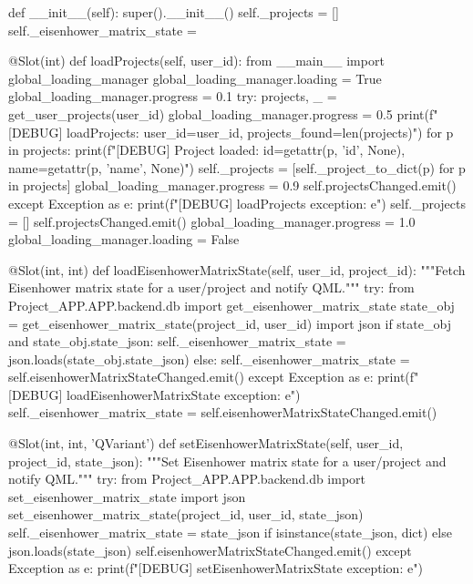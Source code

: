 \documentclass{report}
\begin{document}
\begin{python}
    def __init__(self):
        super().__init__()
        self._projects = []
        self._eisenhower_matrix_state = {}

    @Slot(int)
    def loadProjects(self, user_id):
        from __main__ import global_loading_manager
        global_loading_manager.loading = True
        global_loading_manager.progress = 0.1
        try:
            projects, _ = get_user_projects(user_id)
            global_loading_manager.progress = 0.5
            print(f"[DEBUG] loadProjects: user_id={user_id}, projects_found={len(projects)}")
            for p in projects:
                print(f"[DEBUG] Project loaded: id={getattr(p, 'id', None)}, name={getattr(p, 'name', None)}")
            self._projects = [self._project_to_dict(p) for p in projects]
            global_loading_manager.progress = 0.9
            self.projectsChanged.emit()
        except Exception as e:
            print(f"[DEBUG] loadProjects exception: {e}")
            self._projects = []
            self.projectsChanged.emit()
        global_loading_manager.progress = 1.0
        global_loading_manager.loading = False

    @Slot(int, int)
    def loadEisenhowerMatrixState(self, user_id, project_id):
        """Fetch Eisenhower matrix state for a user/project and notify QML."""
        try:
            from Project_APP.APP.backend.db import get_eisenhower_matrix_state
            state_obj = get_eisenhower_matrix_state(project_id, user_id)
            import json
            if state_obj and state_obj.state_json:
                self._eisenhower_matrix_state = json.loads(state_obj.state_json)
            else:
                self._eisenhower_matrix_state = {}
            self.eisenhowerMatrixStateChanged.emit()
        except Exception as e:
            print(f"[DEBUG] loadEisenhowerMatrixState exception: {e}")
            self._eisenhower_matrix_state = {}
            self.eisenhowerMatrixStateChanged.emit()

    @Slot(int, int, 'QVariant')
    def setEisenhowerMatrixState(self, user_id, project_id, state_json):
        """Set Eisenhower matrix state for a user/project and notify QML."""
        try:
            from Project_APP.APP.backend.db import set_eisenhower_matrix_state
            import json
            set_eisenhower_matrix_state(project_id, user_id, state_json)
            self._eisenhower_matrix_state = state_json if isinstance(state_json, dict) else json.loads(state_json)
            self.eisenhowerMatrixStateChanged.emit()
        except Exception as e:
            print(f"[DEBUG] setEisenhowerMatrixState exception: {e}")


\end{python}
\end{document}
